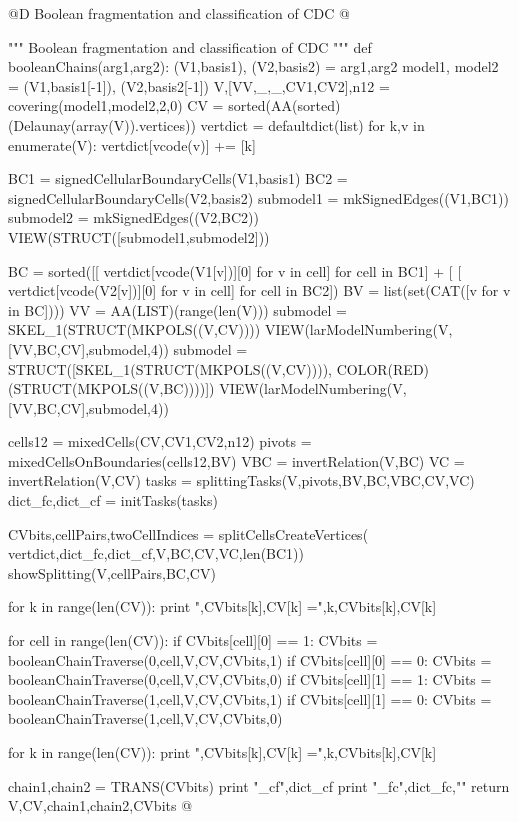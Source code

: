 \documentclass[11pt,oneside]{article}	%
\begin{document}
@D Boolean fragmentation and classification of CDC
@{""" Boolean fragmentation and classification of CDC """
def booleanChains(arg1,arg2):
	(V1,basis1), (V2,basis2) = arg1,arg2
	model1, model2 = (V1,basis1[-1]), (V2,basis2[-1])
	V,[VV,_,_,CV1,CV2],n12 = covering(model1,model2,2,0)
	CV = sorted(AA(sorted)(Delaunay(array(V)).vertices))
	vertdict = defaultdict(list)
	for k,v in enumerate(V): vertdict[vcode(v)] += [k]
	
	BC1 = signedCellularBoundaryCells(V1,basis1)
	BC2 = signedCellularBoundaryCells(V2,basis2)
	submodel1 = mkSignedEdges((V1,BC1))
	submodel2 = mkSignedEdges((V2,BC2))
	VIEW(STRUCT([submodel1,submodel2]))

	BC = sorted([[ vertdict[vcode(V1[v])][0] for v in cell] for cell in BC1] + [ 
			[ vertdict[vcode(V2[v])][0] for v in cell] for cell in BC2])
	BV = list(set(CAT([v for v in BC])))
	VV = AA(LIST)(range(len(V)))
	submodel = SKEL_1(STRUCT(MKPOLS((V,CV))))
	VIEW(larModelNumbering(V,[VV,BC,CV],submodel,4))
	submodel = STRUCT([SKEL_1(STRUCT(MKPOLS((V,CV)))), COLOR(RED)(STRUCT(MKPOLS((V,BC))))])
	VIEW(larModelNumbering(V,[VV,BC,CV],submodel,4))
	
	cells12 = mixedCells(CV,CV1,CV2,n12)
	pivots = mixedCellsOnBoundaries(cells12,BV)
	VBC = invertRelation(V,BC)
	VC = invertRelation(V,CV)
	tasks = splittingTasks(V,pivots,BV,BC,VBC,CV,VC)
	dict_fc,dict_cf = initTasks(tasks)
	
	CVbits,cellPairs,twoCellIndices = splitCellsCreateVertices( 
		vertdict,dict_fc,dict_cf,V,BC,CV,VC,len(BC1))
	showSplitting(V,cellPairs,BC,CV)

	for k in range(len(CV)):  print "\nk,CVbits[k],CV[k] =",k,CVbits[k],CV[k]
	
	for cell in range(len(CV)):
		if CVbits[cell][0] == 1:
			CVbits = booleanChainTraverse(0,cell,V,CV,CVbits,1)		
		if CVbits[cell][0] == 0:
			CVbits = booleanChainTraverse(0,cell,V,CV,CVbits,0)
		if CVbits[cell][1] == 1:
			CVbits = booleanChainTraverse(1,cell,V,CV,CVbits,1)
		if CVbits[cell][1] == 0:
			CVbits = booleanChainTraverse(1,cell,V,CV,CVbits,0)
	
	for k in range(len(CV)):  print "\nk,CVbits[k],CV[k] =",k,CVbits[k],CV[k]
	
	chain1,chain2 = TRANS(CVbits)
	print "\ndict_cf",dict_cf
	print "\ndict_fc",dict_fc,"\n"
	return V,CV,chain1,chain2,CVbits
@}
\end{document}
